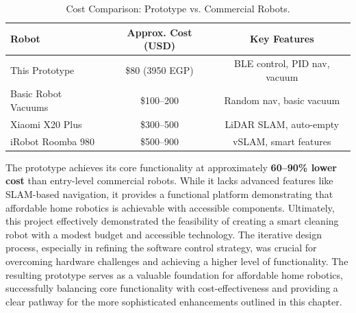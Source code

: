 \begin{table}[htbp]
\centering
\caption{Cost Comparison: Prototype vs. Commercial Robots.}
\label{tab:cost_comparison}
\begin{tabular}{|l|c|c|}
\hline
\textbf{Robot} & \textbf{Approx. Cost (USD)} & \textbf{Key Features} \\ \hline
This Prototype & \$80 (3950 EGP) & BLE control, PID nav, vacuum \\ \hline
Basic Robot Vacuums & \$100--200 & Random nav, basic vacuum \\ \hline
Xiaomi X20 Plus & \$300--500 & LiDAR SLAM, auto-empty \\ \hline
iRobot Roomba 980 & \$500--900 & vSLAM, smart features \\ \hline
\end{tabular}
\end{table}

The prototype achieves its core functionality at approximately \textbf{60--90\% lower cost} than entry-level commercial robots. While it lacks advanced features like SLAM-based navigation, it provides a functional platform demonstrating that affordable home robotics is achievable with accessible components.
Ultimately, this project effectively demonstrated the feasibility of creating a smart cleaning robot with a modest budget and accessible technology. The iterative design process, especially in refining the software control strategy, was crucial for overcoming hardware challenges and achieving a higher level of functionality. The resulting prototype serves as a valuable foundation for affordable home robotics, successfully balancing core functionality with cost-effectiveness and providing a clear pathway for the more sophisticated enhancements outlined in this chapter.


